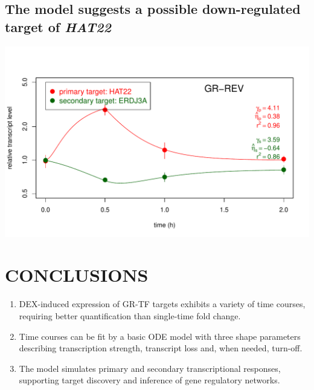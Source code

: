 \documentclass[aspb,landscape]{a0poster}
\newlength{\figwidth}
\begin{document}
\begin{multicols}{4}
  \subsection*{The model suggests a possible down-regulated target of \textit{HAT22}}

  \begin{minipage}[t]{1.0\linewidth}
    \includegraphics[width=\figwidth]{HAT22-ERDJ3A}
  \end{minipage}

  

  \section*{CONCLUSIONS}
  \color{CarnegiePriBlue}
  
  \begin{enumerate}
  \item DEX-induced expression of GR-TF targets exhibits a variety of time courses, requiring better quantification than single-time fold change.
  \item Time courses can be fit by a basic ODE model with three shape parameters describing transcription strength, transcript loss and, when needed, turn-off.
  \item The model simulates primary and secondary transcriptional responses, supporting target discovery and inference of gene regulatory networks.
  \end{enumerate}


\end{multicols}
\end{document}
